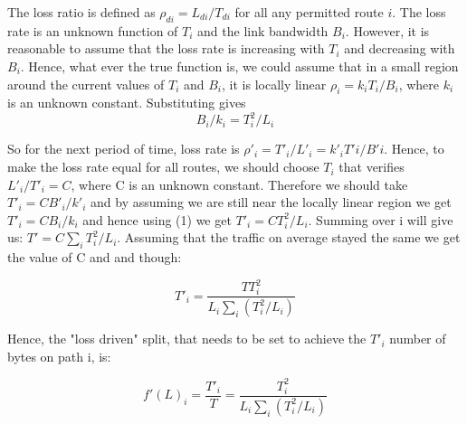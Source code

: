 The loss ratio is defined as $\rho_{di} = L_{di}/T_{di}$ for all any permitted route $i$. The loss rate is an unknown function of $T_{i}$ and the link bandwidth $B_{i}$. However, it is reasonable to assume that the loss rate is increasing with $T_{i}$ and decreasing with $B_{i}$. Hence, what ever the true function is, we could assume that in a small region around the current values of $T_{i}$ and $B_{i}$, it is locally linear $\rho_{i} = k_{i}T_{i}/B_{i}$, where $k_{i}$ is an unknown constant. Substituting gives
\begin{equation}
B_{i}/k_{i} = T_{i}^{2}/L_{i}
\end{equation}

So for the next period of time, loss rate is $\rho'_{i} = T'_{i}/L'_{i} = k'_{i}T'{i}/B'{i}$. Hence, to make the loss rate equal for all routes, we should choose $T_{i}$ that verifies $L'_{i}/T'_{i}=C$, where C is an unknown constant. Therefore we should take  $T'_{i}= CB'_{i}/k'_{i}$ and by assuming we are still near the locally linear region we get  $T'_{i}= CB_{i}/k_{i}$ and hence using (1) we get  $T'_{i}= CT_{i}^{2}/L_{i}$. Summing over i will give us: $T' = C \sum_{i} T_{i}^2/L_{i}$. Assuming that the traffic on average stayed the same we get the value of C and and though: 

\begin{equation}
T'_{i} = \frac {TT_{i}^{2}} {L_{i} \sum_{i} (T_{i}^2/L_{i})}
\end{equation}

Hence, the "loss driven" split, that needs to be set to achieve the $T'_{i}$ number of bytes on path i, is:

\begin{equation}
f'(L)_{i} = \frac{T'_{i}}{T} =  \frac {T_{i}^{2}} {L_{i} \sum_{i} (T_{i}^2/L_{i})}
\end{equation}
